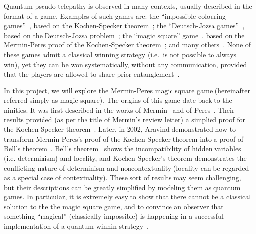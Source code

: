 \documentclass{llncs}
\begin{document}
Quantum pseudo-telepathy is observed in many contexts, usually
described in the format of a game. Examples of such games are: the
``impossible colouring games''~\cite{cleve:2004}, based on the
Kochen-Specker theorem~\cite{kochen:1967};
the ``Deutsch-Jozsa games''~\cite{brassard:1999}, based on the Deutsch-Jozsa problem~\cite{deutsch:1992};
the ``magic square'' game~\cite{aravind:2002}, based on the Mermin-Peres proof of the
Kochen-Specker theorem~\cite{mermin:1990, peres:1990, mermin:1993, peres:1997}; and many
others~\cite{cleve:2004, brassard:2005}. None of these games admit a
classical winning strategy (i.e.\ is not possible to always win), yet
they can be won systematically, without any communication, provided
that the players are allowed to share prior entanglement~\cite{brassard:2005}.

In this project, we will explore the Mermin-Peres magic square game
(hereinafter referred simply as magic square). The origins of this
game date back to the ninities. It was first described in the works of
Mermin~\cite{mermin:1990, mermin:1993} and of
Peres~\cite{peres:1990, peres:1997}. Their results provided (as per the title of
Mermin's review letter) a simplied proof for the Kochen-Specker
theorem~\cite{kochen:1967}. Later, in 2002, Aravind demonstrated how
to transform Mermin-Peres's proof of the Kochen-Specker theorem into a
proof of Bell's theorem~\cite{aravind:2002}. Bell's
theorem~\cite{bell:1964} shows the incompatibility of hidden variables
(i.e. determinism) and locality, and Kochen-Specker's theorem
demonstrates the conflicting nature of determinism and
noncontextuality (locality can be regarded as a special case of
contextuality). These sort of results may seem
challenging, but their descriptions can be greatly simplified by
modeling them as quantum games.  In particular, it is extremely easy
to show that there cannot be a classical solution to the the magic
square game, and to convince an observer that something ``magical''
(classically impossible) is happening in a successful implementation
of a quantum winnin strategy~\cite{brassard:2005}.
\end{document}
